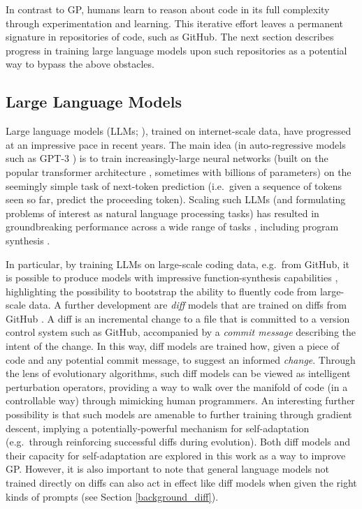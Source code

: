 \documentclass{article}
\begin{document}
In contrast to GP, humans learn to reason about code in its full complexity through experimentation and learning. This iterative effort leaves a permanent signature in repositories of code, such as GitHub. The next section describes progress in training large language models upon such repositories as a potential way to bypass the above obstacles.

\subsection{Large Language Models}

Large language models (LLMs; \cite{bommasani2021opportunities,devlin2018bert,brown2020language}), trained on internet-scale data, have progressed at an
impressive pace in recent years. The main idea (in auto-regressive models such as GPT-3 \cite{brown2020language}) is to train increasingly-large 
neural networks (built on the popular transformer architecture \cite{vaswani:transformer}, sometimes with billions of parameters) on the seemingly simple task of next-token prediction (i.e.\ given a sequence of tokens seen so far, predict the proceeding token). Scaling such LLMs (and formulating problems of interest as natural language processing tasks) has resulted in 
groundbreaking performance across a wide range of tasks \cite{brown2020language,chowdhery2022palm}, 
including program synthesis \cite{chen:codex,hendrycks2021measuring,li2022competition}.

In particular, by training LLMs on large-scale coding data, e.g.\ from GitHub, 
it is possible to produce models with impressive
function-synthesis capabilities \cite{chen:codex,li2022competition}, highlighting the possibility to bootstrap the ability to fluently code from large-scale data. A further development are \emph{diff} models that are trained on diffs from GitHub \cite{diff_train}. A diff is an incremental change to a file that is committed to a version control system such as GitHub, accompanied by a \emph{commit message} describing the intent of the change. In this way, diff models are trained how, given a piece of code and any potential commit message, to suggest an informed \emph{change}. Through the lens of evolutionary algorithms, such diff models can be viewed as intelligent perturbation operators, providing a way to walk over the manifold of code (in a controllable way) through mimicking human programmers. An interesting further possibility is that such models are amenable to further
training through gradient descent, implying a potentially-powerful mechanism for self-adaptation (e.g.\ through reinforcing successful diffs during evolution). Both diff models and their capacity for self-adaptation are explored in this work as a way to improve GP.  However, it is also important to note that general language models not trained directly on diffs can also act in effect like diff models when given the right kinds of prompts (see Section \ref{background_diff}).
\end{document}
